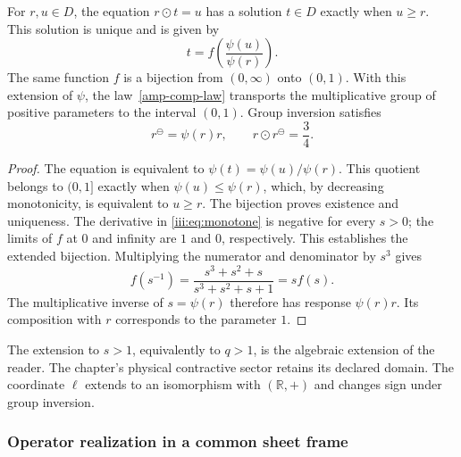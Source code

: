 \begin{proposition}
\label{amp-comp-inverse}
For $r,u\in D$, the equation $r\odot t=u$ has a solution $t\in D$
exactly when $u\geq r$. This solution is unique and is given by
\begin{equation}
 t=f\!\left(\frac{\psi(u)}{\psi(r)}\right).
 \label{amp-comp-cancellation}
\end{equation}
The same function $f$ is a bijection from $(0,\infty)$ onto $(0,1)$.
With this extension of $\psi$, the law~\eqref{amp-comp-law} transports
the multiplicative group of positive parameters to the interval $(0,1)$.
Group inversion satisfies
\begin{equation}
 r^{\ominus}=\psi(r)r,\qquad
 r\odot r^{\ominus}=\frac34.
 \label{amp-comp-group-inverse}
\end{equation}
\end{proposition}
\begin{proof}
The equation is equivalent to
$\psi(t)=\psi(u)/\psi(r)$. This quotient belongs to $(0,1]$ exactly
when $\psi(u)\leq\psi(r)$, which, by decreasing monotonicity, is
equivalent to $u\geq r$. The bijection proves existence and uniqueness.
The derivative in \eqref{iii:eq:monotone} is negative for every $s>0$;
the limits of $f$ at $0$ and infinity are $1$ and $0$, respectively.
This establishes the extended bijection. Multiplying the numerator and
denominator by $s^3$ gives
\[
 f(s^{-1})=\frac{s^3+s^2+s}{s^3+s^2+s+1}=s f(s).
\]
The multiplicative inverse of $s=\psi(r)$ therefore has response
$\psi(r)r$. Its composition with $r$ corresponds to the parameter $1$.
\end{proof}

The extension to $s>1$, equivalently to $q>1$, is the algebraic extension
of the reader. The chapter's physical contractive sector retains its
declared domain. The coordinate $\ell$ extends to an isomorphism with
$(\mathbb R,+)$ and changes sign under group inversion.

\subsubsection{Operator realization in a common sheet frame}

